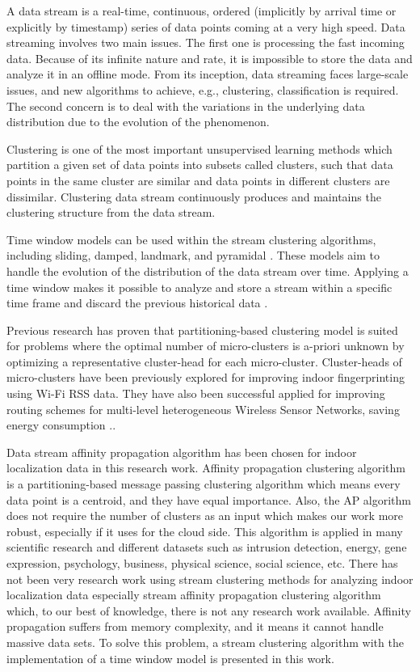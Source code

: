 A data stream is a real-time, continuous, ordered (implicitly by arrival time or explicitly by timestamp) series of data points coming at a very high speed. Data streaming involves two main issues. The first one is processing the fast incoming data. Because of its infinite nature and rate, it is impossible to store the data and analyze it in an offline mode. From its inception, data streaming faces large-scale issues, and new algorithms to achieve, e.g., clustering, classification is required.
The second concern is to deal with the variations in the underlying data distribution due to the evolution of the phenomenon.

Clustering is one of the most important unsupervised learning methods which partition a given set of data points into subsets called clusters, such that data points in the same cluster are similar and data points in different clusters are dissimilar. Clustering data stream continuously produces and maintains the clustering structure from the data stream.

Time window models can be used within the stream clustering algorithms, including sliding, damped, landmark, and pyramidal \cite{nguyen2015survey}. These models aim to handle the evolution of the distribution of the data stream over time. Applying a time window makes it possible to analyze and store a stream within a specific time frame and discard the previous historical data \cite{mansalis2018evaluation}.

Previous research has proven that partitioning-based clustering model is suited for problems where the optimal number of micro-clusters is a-priori unknown by optimizing a representative cluster-head for each micro-cluster. Cluster-heads of micro-clusters have been previously explored for improving indoor fingerprinting using Wi-Fi RSS data\cite{hu2015improving, subedi2019improving}. They have also been successful applied for improving routing schemes for multi-level heterogeneous Wireless Sensor Networks, saving energy consumption \cite{wang2019affinity}.. 

Data stream affinity propagation algorithm has been chosen for indoor localization data in this research work. Affinity propagation \cite{dueck2009affinity} clustering algorithm is a partitioning-based message passing clustering algorithm which means every data point is a centroid, and they have equal importance. Also, the AP algorithm does not require the number of clusters as an input which makes our work more robust, especially if it uses for the cloud side. This algorithm is applied in many scientific research and different datasets such as intrusion detection, energy, gene expression, psychology, business, physical science, social science, etc. There has not been very research work using stream clustering methods for analyzing indoor localization data especially stream affinity propagation clustering algorithm \cite{dueck2009affinity} which, to our best of knowledge, there is not any research work available.
Affinity propagation suffers from memory complexity, and it means it cannot handle massive data sets. To solve this problem, a stream clustering algorithm with the implementation of a time window model is presented in this work. 

